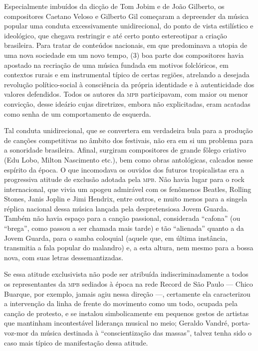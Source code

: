 Especialmente imbuídos da dicção de Tom Jobim e de João Gilberto, os
compositores Caetano Veloso e Gilberto Gil começaram a depreender da
música popular uma conduta excessivamente unidirecional, do ponto de
vista estilístico e ideológico, que chegava restringir e até certo ponto
estereotipar a criação brasileira. Para tratar de conteúdos nacionais,
em que predominava a utopia de uma nova sociedade em um novo tempo, (3)
boa parte dos compositores havia apostado na recriação de uma música
fundada em motivos folclóricos, em contextos rurais e em instrumental
típico de certas regiões, atrelando a desejada revolução político-social
à consciência da própria identidade e à autenticidade dos valores
defendidos. Todos os autores da \textsc{mpb} participavam, com maior ou menor
convicção, desse ideário cujas diretrizes, embora não explicitadas, eram
acatadas como senha de um comportamento de esquerda.

Tal conduta unidirecional, que se convertera em verdadeira bula para a
produção de canções competitivas no âmbito dos festivais, não era em si
um problema para a sonoridade brasileira. Afinal, surgiram compositores
de grande fôlego criativo (Edu Lobo, Milton Nascimento etc.), bem como
obras antológicas, calcados nesse espírito da época. O que incomodava os
ouvidos dos futuros tropicalistas era a progressiva atitude de exclusão
adotada pela \textsc{mpb}. Não havia lugar para o rock internacional, que vivia
um apogeu admirável com os fenômenos Beatles, Rolling Stones, Janis
Joplin e Jimi Hendrix, entre outros, e muito menos para a singela
réplica nacional dessa música lançada pela despretensiosa Jovem Guarda.
Também não havia espaço para a canção passional, considerada ``cafona''
(ou ``brega'', como passou a ser chamada mais tarde) e tão ``alienada''
quanto a da Jovem Guarda, para o samba coloquial (aquele que, em última
instância, transmitia a fala popular do malandro) e, a esta altura, nem
mesmo para a bossa nova, com suas letras dessemantizadas.

Se essa atitude exclusivista não pode ser atribuída indiscriminadamente
a todos os representantes da \textsc{mpb} sediados à época na rede Record de São
Paulo --- Chico Buarque, por exemplo, jamais agiu nessa direção ---,
certamente ela caracterizou a intervenção da linha de frente do
movimento como um todo, ocupada pela canção de protesto, e se instalou
simbolicamente em pequenos gestos de artistas que mantinham
incontestável liderança musical no meio; Geraldo Vandré, porta-voz-mor
da música destinada à ``conscientização das massas'', talvez tenha sido
o caso mais típico de manifestação dessa atitude.

